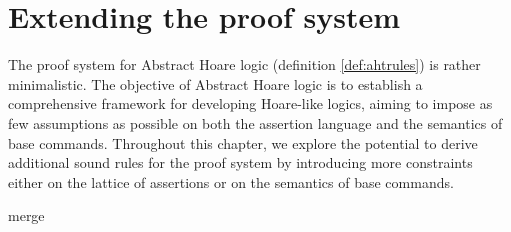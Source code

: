 \chapter{Extending the proof system}

The proof system for Abstract Hoare logic (definition \ref{def:ahtrules}) is
rather minimalistic. The objective of Abstract Hoare logic is to establish a
comprehensive framework for developing Hoare-like logics, aiming to impose as
few assumptions as possible on both the assertion language and the semantics of
base commands. Throughout this chapter, we explore the potential to derive
additional sound rules for the proof system by introducing more constraints
either on the lattice of assertions or on the semantics of base commands.

{merge}
